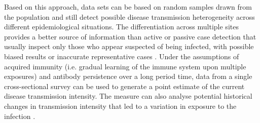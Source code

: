 Based on this approach, data sets can be based on random samples drawn from the population and still detect possible disease transmission heterogeneity across different epidemiological situations.
The differentiation across multiple sites provides a better source of information than active or passive case detection that usually inspect only those who appear suspected of being infected, with possible biased results or inaccurate representative cases \cite{nkumama2017changes}.
Under the assumptions of acquired immunity (i.e. gradual learning of the immune system upon multiple exposures) and antibody persistence over a long period time, data from a single cross-sectional survey can be used to generate a point estimate of the current disease transmission intensity.
The measure can also analyse potential historical changes in transmission intensity that led to a variation in exposure to the infection \cite{hens2012modeling}.

